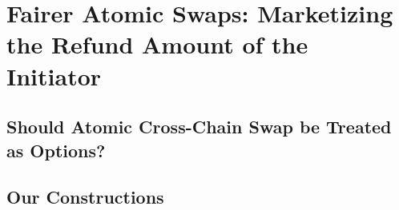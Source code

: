 \section{Fairer Atomic Swaps: Marketizing the Refund Amount of the Initiator}
\label{sec:fairer_atomic_swap}

\subsection{Should Atomic Cross-Chain Swap be Treated as Options?}

\subsection{Our Constructions}